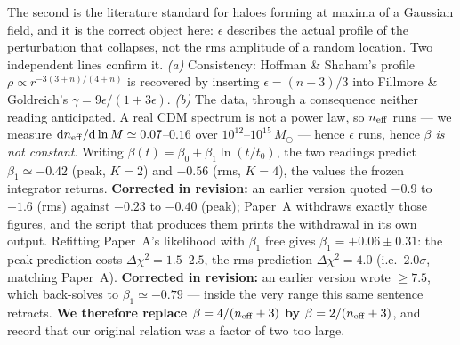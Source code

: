 \documentclass[11pt]{article}
\begin{document}
The second is the literature standard for haloes forming at maxima of a Gaussian field, and it is
the correct object here: $\epsilon$ describes the actual profile of the perturbation that
collapses, not the rms amplitude of a random location. Two independent lines confirm it.
\emph{(a)} Consistency: Hoffman \& Shaham's profile $\rho \propto r^{-3(3+n)/(4+n)}$ is recovered
by inserting $\epsilon = (n+3)/3$ into Fillmore \& Goldreich's $\gamma = 9\epsilon/(1+3\epsilon)$.
\emph{(b)} The data, through a consequence neither reading anticipated. A real CDM spectrum is not
a power law, so $n_{\rm eff}$ runs --- we measure
$\mathrm{d}n_{\rm eff}/\mathrm{d}\ln M \simeq 0.07$--$0.16$ over $10^{12}$--$10^{15}\,M_\odot$ ---
hence $\epsilon$ runs, hence \emph{$\beta$ is not constant}. Writing
$\beta(t) = \beta_0 + \beta_1\ln(t/t_0)$, the two readings predict
$\beta_1 \simeq -0.42$ (peak, $K=2$) and $-0.56$ (rms, $K=4$), the values the frozen integrator returns. \textbf{Corrected in revision:} an earlier version quoted $-0.9$ to $-1.6$ (rms) against $-0.23$ to $-0.40$ (peak); Paper~A withdraws exactly those figures, and the script that produces them prints the withdrawal in its own output. Refitting Paper~A's
likelihood with $\beta_1$ free gives $\beta_1 = +0.06 \pm 0.31$: the peak prediction costs
$\Delta\chi^2 = 1.5$--$2.5$, the rms prediction $\Delta\chi^2 = 4.0$ (i.e.\ $2.0\sigma$, matching Paper~A). \textbf{Corrected in revision:} an earlier version wrote $\geq 7.5$, which back-solves to $\beta_1 \simeq -0.79$ --- inside the very range this same sentence retracts. \textbf{We therefore replace $\beta = 4/(n_{\rm eff}+3)$ by $\beta = 2/(n_{\rm eff}+3)$},
and record that our original relation was a factor of two too large.
\end{document}

